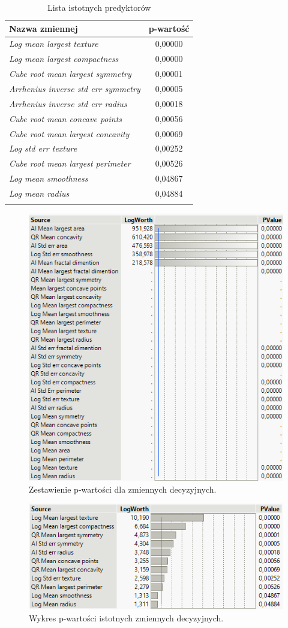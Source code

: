 \begin{longtable}{l|c}
	\centering
	Nazwa zmiennej & p-wartość \\
	\hline
	\textit{Log mean largest texture} & 0,00000 \\
	\textit{Log mean largest compactness} & 0,00000 \\
	\textit{Cube root mean largest symmetry} & 0,00001 \\
	\textit{Arrhenius inverse std err symmetry} & 0,00005 \\
	\textit{Arrhenius inverse std err radius} & 0,00018 \\
	\textit{Cube root mean concave points} & 0,00056 \\
	\textit{Cube root mean largest concavity} & 0,00069 \\
	\textit{Log std err texture} & 0,00252 \\
	\textit{Cube root mean largest perimeter} & 0,00526 \\
	\textit{Log mean smoothness} & 0,04867 \\
	\textit{Log mean radius} & 0,04884 \\
	\caption{Lista istotnych predyktorów}
	\label{lin_reg:1}
\end{longtable}

\begin{figure}[!ht]
	\centering
	\includegraphics[width=0.7\linewidth]{Rysunki/Rozdzial3/pvalue1}
	\caption{Zestawienie p-wartości dla zmiennych decyzyjnych.}
	\label{fig:pvalue1}
\end{figure}

\begin{figure}[!ht]
	\centering
	\includegraphics[width=0.7\linewidth]{Rysunki/Rozdzial3/pvalue2}
	\caption{Wykres p-wartości istotnych zmiennych decyzyjnych.}
	\label{fig:pvalue2}
\end{figure}

